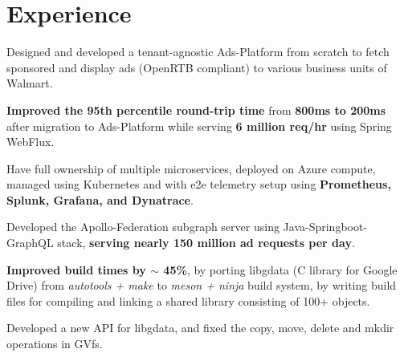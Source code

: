 \documentclass[a4paper]{deedy-resume-reversed}
\begin{document}
\begin{minipage}[t]{0.60\textwidth}


\section{Experience}
\vspace{10pt} %
\begin{tightemize}
\item Designed and developed a tenant-agnostic Ads-Platform from scratch to fetch sponsored and display ads (OpenRTB compliant) to various business units of Walmart.
\item \textbf{Improved the 95th percentile round-trip time} from \textbf{800ms to 200ms} after migration to Ads-Platform while serving \textbf{6 million req/hr} using Spring WebFlux.
\item Have full ownership of multiple microservices, deployed on Azure compute, managed using Kubernetes and with e2e telemetry setup using \textbf{Prometheus, Splunk, Grafana, and Dynatrace}.
\item Developed the Apollo-Federation subgraph server using Java-Springboot-GraphQL stack, \textbf{serving nearly 150 million ad requests per day}.
\end{tightemize}
\sectionsep

\begin{tightemize}
    \item \textbf{Improved build times by $\sim$ 45\%}, by porting libgdata (C library for Google Drive) from \textit{autotools + make} to \textit{meson + ninja} build system, by writing build files for compiling and linking a shared library consisting of 100+ objects.
    \item Developed a new API for libgdata, and fixed the copy, move, delete and mkdir operations in GVfs.
\end{tightemize}
\sectionsep


\end{minipage}
\end{document}
